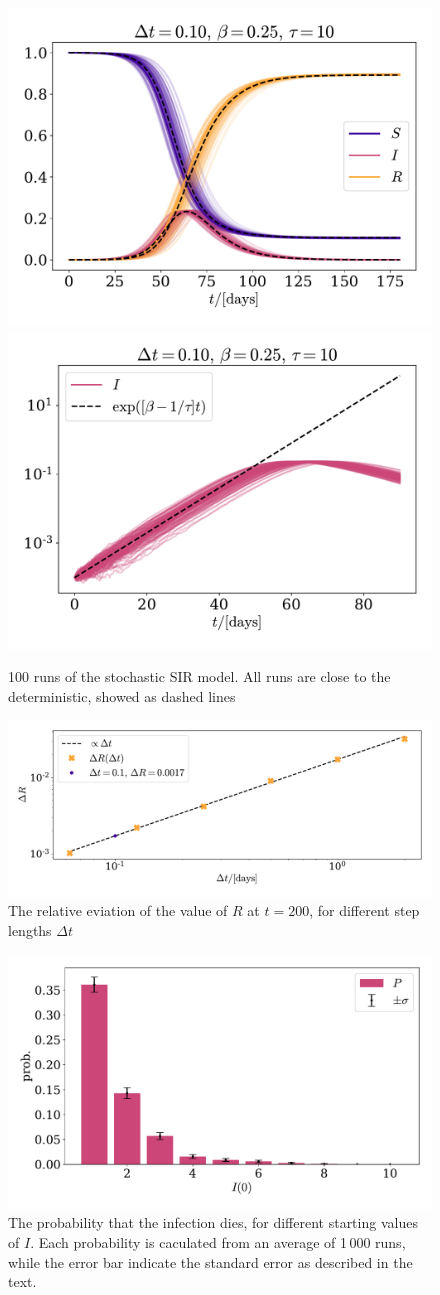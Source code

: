 \documentclass{article}
\begin{document}
    \begin{figure}[H]
        \centering
        \includegraphics[width=.49\textwidth]{../plots/2B/TestSIR_stoch.pdf}
        \includegraphics[width=.49\textwidth]{../plots/2B/TestI_stoch.pdf}
        \caption{100 runs of the stochastic SIR model. All runs are close to the deterministic, showed as dashed lines}
        \label{stochastic SIR}
    \end{figure}

    \begin{figure}[H]
        \centering
        \includegraphics[width=.7\textwidth]{../plots/2B/conv.pdf}
        \caption{The relative eviation of the value of $R$ at $t=200$, for different step lengths $\Delta t$}
        \label{conv}
    \end{figure}


    \begin{figure}[H]
        \centering
        \includegraphics[width=.7\textwidth]{../plots/2B/disappear.pdf}
        \caption{The probability that the infection dies, for different starting values of $I$. Each probability is caculated from an average of 1\,000 runs, while the error bar indicate the standard error as described in the text.}
        \label{Disappear}
    \end{figure}
\end{document}
